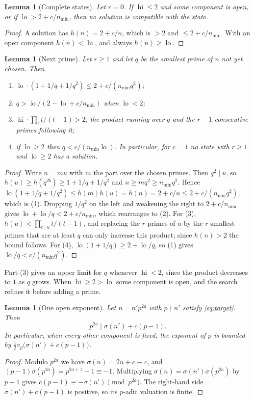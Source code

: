 \documentclass[11pt]{amsart}
\newtheorem{lemma}[theorem]{Lemma}
\theoremstyle{remark}
\DeclareMathOperator{\lo}{lo}
\DeclareMathOperator{\hi}{hi}
\begin{document}
\begin{lemma}[Complete states]\label{lem:complete}
Let $r = 0$. If $\hi \le 2$ and some component is open, or if
$\lo > 2 + c/n_{\min}$, then no solution is compatible with the state.
\end{lemma}
\begin{proof}
A solution has $h(n) = 2 + c/n$, which is $> 2$ and $\le 2 + c/n_{\min}$. With
an open component $h(n) < \hi$, and always $h(n) \ge \lo$.
\end{proof}

\begin{lemma}[Next prime]\label{lem:range}
Let $r \ge 1$ and let $q$ be the smallest prime of $n$ not yet chosen. Then
\begin{enumerate}
\item $\lo \cdot (1 + 1/q + 1/q^2) \le 2 + c/(n_{\min} q^2)$;
\item $q > \lo / (2 - \lo + c/n_{\min})$ when $\lo < 2$;
\item $\hi \cdot \prod_{t} t/(t-1) > 2$, the product running over $q$ and the
  $r - 1$ consecutive primes following it;
\item if $\lo \ge 2$ then $q < c/(n_{\min}\lo)$. In particular, for $c = 1$ no
  state with $r \ge 1$ and $\lo \ge 2$ has a solution.
\end{enumerate}
\end{lemma}
\begin{proof}
Write $n = m u$ with $m$ the part over the chosen primes. Then $q^2 \mid u$, so
$h(u) \ge h(q^{2b}) \ge 1 + 1/q + 1/q^2$ and $n \ge m q^2 \ge n_{\min} q^2$.
Hence
$\lo(1 + 1/q + 1/q^2) \le h(m)h(u) = h(n) = 2 + c/n \le 2 + c/(n_{\min}q^2)$,
which is (1). Dropping $1/q^2$ on the left and weakening the right to
$2 + c/n_{\min}$ gives $\lo + \lo/q < 2 + c/n_{\min}$, which rearranges to (2).
For (3), $h(u) < \prod_{t \mid u} t/(t-1)$, and replacing the $r$ primes of $u$
by the $r$ smallest primes that are at least $q$ can only increase this
product; since $h(n) > 2$ the bound follows. For (4),
$\lo(1 + 1/q) \ge 2 + \lo/q$, so (1) gives $\lo/q < c/(n_{\min}q^2)$.
\end{proof}

Part (3) gives an upper limit for $q$ whenever $\hi < 2$, since the product
decreases to $1$ as $q$ grows. When $\hi \ge 2 > \lo$ some component is open,
and the search refines it before adding a prime.

\begin{lemma}[One open exponent]\label{lem:oneexp}
Let $n = n' p^{2a}$ with $p \nmid n'$ satisfy \eqref{eq:target}. Then
\[
  p^{2a} \mid \sigma(n') + c(p - 1).
\]
In particular, when every other component is fixed, the exponent of $p$ is
bounded by $\frac12 v_p\bigl(\sigma(n') + c(p-1)\bigr)$.
\end{lemma}
\begin{proof}
Modulo $p^{2a}$ we have $\sigma(n) = 2n + c \equiv c$, and
$(p-1)\sigma(p^{2a}) = p^{2a+1} - 1 \equiv -1$. Multiplying
$\sigma(n) = \sigma(n')\sigma(p^{2a})$ by $p - 1$ gives
$c(p-1) \equiv -\sigma(n') \pmod{p^{2a}}$. The right-hand side
$\sigma(n') + c(p-1)$ is positive, so its $p$-adic valuation is finite.
\end{proof}
\end{document}
